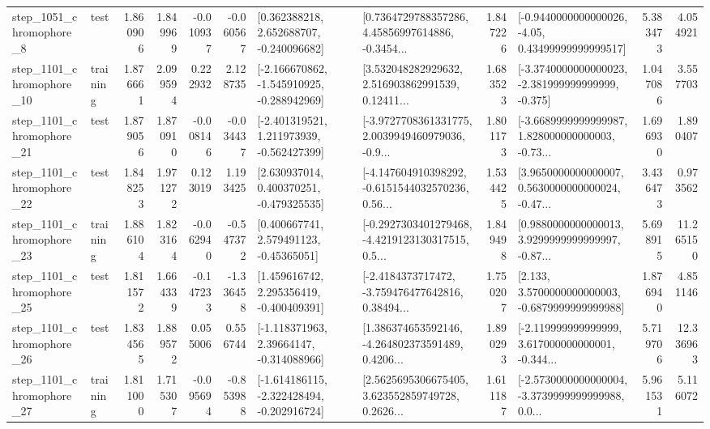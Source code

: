 \begin{tabular}{llrrrrllrlrr}
  step\_1051\_chromophore\_8 &      test &      1.860906 &    1.849969 &     -0.010937 & -0.060567 &    [0.362388218, 2.652688707, -0.240096682] &  [0.7364729788357286, 4.45856997614886, -0.3454... &       1.847226 &  [-0.9440000000000026, -4.05, 0.43499999999999517] &            5.383473 &          4.054921 \\
 step\_1101\_chromophore\_10 &  training &      1.876661 &    2.099594 &      0.222932 &  2.128735 &  [-2.166670862, -1.545910925, -0.288942969] &  [3.532048282929632, 2.516903862991539, 0.12411... &       1.683523 &  [-3.3740000000000023, -2.381999999999999, -0.375] &            1.047086 &          3.557703 \\
 step\_1101\_chromophore\_21 &      test &      1.879056 &    1.870910 &     -0.008146 & -0.034437 &   [-2.401319521, 1.211973939, -0.562427399] &  [-3.9727708361331775, 2.0039949460979036, -0.9... &       1.801173 &  [-3.6689999999999987, 1.828000000000003, -0.73... &            1.696930 &          1.890407 \\
 step\_1101\_chromophore\_22 &      test &      1.848253 &    1.971272 &      0.123019 &  1.193425 &    [2.630937014, 0.400370251, -0.479325535] &  [-4.147604910398292, -0.6151544032570236, 0.56... &       1.534425 &  [3.9650000000000007, 0.5630000000000024, -0.47... &            3.436473 &          0.973562 \\
 step\_1101\_chromophore\_23 &  training &      1.886104 &    1.823164 &     -0.062940 & -0.547372 &     [0.400667741, 2.579491123, -0.45365051] &  [-0.2927303401279468, -4.4219123130317515, 0.5... &       1.849498 &  [0.9880000000000013, 3.9299999999999997, -0.87... &            5.698915 &         11.265150 \\
 step\_1101\_chromophore\_25 &      test &      1.811572 &    1.664339 &     -0.147233 & -1.336458 &    [1.459616742, 2.295356419, -0.400409391] &  [-2.4184373717472, -3.759476477642816, 0.38494... &       1.750207 &   [2.133, 3.5700000000000003, -0.6879999999999988] &            1.876940 &          4.851146 \\
 step\_1101\_chromophore\_26 &      test &      1.834565 &    1.889572 &      0.055006 &  0.556744 &    [-1.118371963, 2.39664147, -0.314088966] &  [1.386374653592146, -4.264802373591489, 0.4206... &       1.890293 &  [-2.119999999999999, 3.617000000000001, -0.344... &            5.719706 &         12.336963 \\
 step\_1101\_chromophore\_27 &  training &      1.811000 &    1.715307 &     -0.095694 & -0.853988 &  [-1.614186115, -2.322428494, -0.202916724] &  [2.5625695306675405, 3.623552859749728, 0.2626... &       1.611187 &  [-2.5730000000000004, -3.3739999999999988, 0.0... &            5.961531 &          5.116072 \\

\end{tabular}
